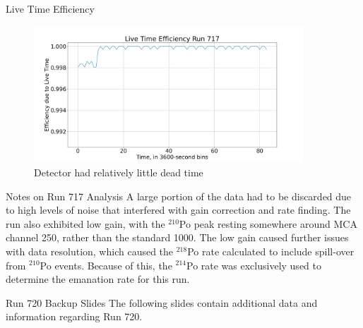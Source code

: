 \documentclass[aspectratio=169]{beamer}
\begin{document}
\begin{frame}{Live Time Efficiency}
    \begin{figure}
        \begin{center}
            \includegraphics[width=0.9\textwidth]
            {assets/717/LTE.png}
            \caption{Detector had relatively little dead time}
        \end{center}
    \end{figure}
\end{frame}

\begin{frame}{Notes on Run 717 Analysis}
    A large portion of the data had to be discarded due to high levels of noise that interfered
    with gain correction and rate finding.
    The run also exhibited low gain, with the $^{210}$Po peak resting somewhere around MCA channel
    250, rather than the standard 1000.
    The low gain caused further issues with data resolution, which caused the $^{218}$Po rate calculated
    to include spill-over from $^{210}$Po events.
    Because of this, the $^{214}$Po rate was exclusively used to determine the emanation rate for this run.

    \hyperlink{RvT_717}{}
\end{frame}

\begin{frame}{Run 720 Backup Slides}
\label{720_Backup}
    The following slides contain additional data and information regarding Run 720.
\end{frame}
\end{document}
